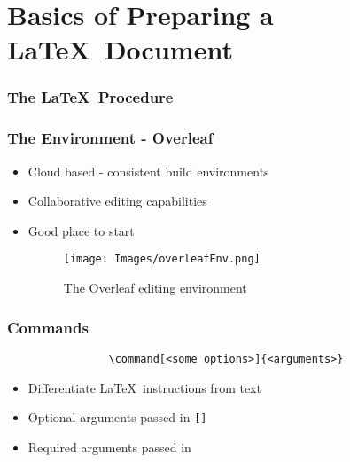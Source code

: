 \documentclass{beamer}
\begin{document}
    \section{Basics of Preparing a \LaTeX~Document}
        \begin{frame}[fragile]
            \frametitle{The \LaTeX~Procedure}
        \end{frame}
        \begin{frame}
            \frametitle{The Environment - Overleaf}
            \begin{itemize}
                \item Cloud based - consistent build environments
                \item Collaborative editing capabilities
                \item Good place to start
                \begin{figure}
                    \begin{centering}
                        \texttt{[image: Images/overleafEnv.png]}
                        \caption{The Overleaf editing environment}
                        \label{fig:overleafEnv}
                    \end{centering}
                \end{figure}
            \end{itemize}
        \end{frame}
        \begin{frame}[fragile]
            \frametitle{Commands}
            \begin{verbatim}
                \command[<some options>]{<arguments>}
            \end{verbatim}
            \begin{itemize}
                \item Differentiate \LaTeX~instructions from text
                \item Optional arguments passed in \texttt{[]}
                \item Required arguments passed in \texttt{{}}
            \end{itemize}
        \end{frame}
\end{document}

